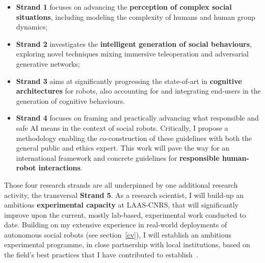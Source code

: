 \vspace{0.5em}
\begin{itemize}
    \item {\bf Strand 1} focuses on advancing the \textbf{perception of complex social
        situations}, including modeling the complexity of humans and human group
        dynamics;
    \item {\bf Strand 2} investigates the \textbf{intelligent generation of social
        behaviours}, exploring novel techniques mixing immersive teleoperation
        and adversarial generative networks;
    \item {\bf Strand 3} aims at significantly progressing the state-of-art in
        \textbf{cognitive architectures} for robots, also accounting for and integrating
        end-users in the generation of cognitive behaviours.
    \item {\bf Strand 4} focuses on framing and practically advancing what
        responsible and safe AI means in the context of social robots.
        Critically, I propose a methodology enabling the co-construction of
        these guidelines with both the general public and ethics expert. This
        work will pave the way for an international framework and concrete
        guidelines for \textbf{responsible
        human-robot interactions}.
\end{itemize}
\vspace{0.5em}


Those four research strands are all underpinned by one additional research
activity, the transversal {\bf Strand 5}. As a research scientist, I will
build-up an ambitious \textbf{experimental capacity} at LAAS-CNRS, that will
significantly improve upon the current, mostly lab-based, experimental work
conducted to date. Building on my extensive experience in real-world deployments
of autonomous social robots (see section~\ref{cv}), I will establish an
ambitious experimental programme, in close partnership with local institutions,
based on the field's best practices that I have contributed to
establish~\parencite{baxter2016characterising}.



